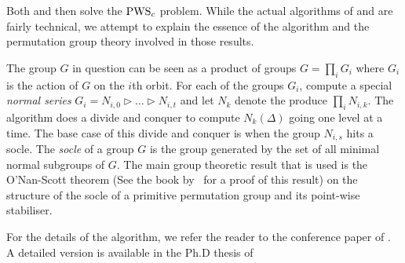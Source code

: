 \documentclass{article}
\newtheorem{theorem}{Theorem}[section]
\begin{document}
Both \citet{luks86parallel} and \citet{arvind2005bounded} then solve
the $\mathrm{PWS}_{c}$ problem.  While the actual algorithms of
\citet{luks86parallel} and \citet{arvind2005bounded} are fairly
technical, we attempt to explain the essence of the algorithm and the
permutation group theory involved in those results.

The group $G$ in question can be seen as a product of groups $G =
\prod_i G_i$ where $G_i$ is the action of $G$ on the $i$th orbit. For
each of the groups $G_i$, compute a special \emph{normal series} $G_i
= N_{i,0} \rhd \ldots \rhd N_{i,t}$ and let $N_k$ denote the produce
$\prod_i N_{i,k}$. The algorithm does a divide and conquer to compute
$N_k(\Delta)$ going one level at a time. The base case of this divide
and conquer is when the group $N_{i,s}$ hits a socle. The \emph{socle}
of a group $G$ is the group generated by the set of all minimal normal
subgroups of $G$.  The main group theoretic result that is used is the
O'Nan-Scott theorem (See the book by~\citet{dixon91permutationbook}
for a proof of this result) on the structure of the socle of a
primitive permutation group and its point-wise stabiliser.




For the details of the algorithm, we refer the reader to the
conference paper of \citet{arvind2005bounded}. A detailed version is
available in the Ph.D thesis of \citet[Chapter 5]{K2006}
\end{document}
